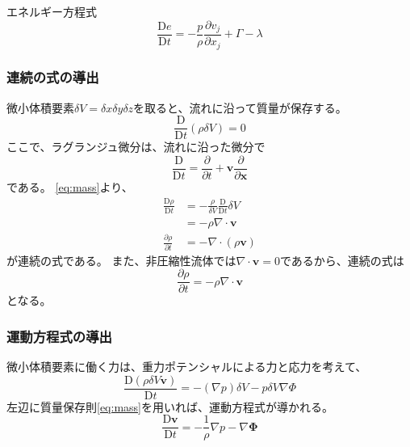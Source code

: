 \documentclass{jsarticle}
\newcommand{\bx}{\mathbf{x}}
\newcommand{\bv}{\mathbf{v}}
\newcommand{\pder}[2][]{\frac{\partial#1}{\partial#2}}
\newcommand{\Dder}[2][]{\frac{\mathrm{D}#1}{\mathrm{D}#2}}
\begin{document}
エネルギー方程式
\begin{equation}
    \Dder[e]{t} = - \frac{p}{\rho} \pder[v_j]{x_j} + \Gamma - \lambda
\end{equation}
\subsubsection{連続の式の導出}
微小体積要素$\delta V = \delta x \delta y \delta z$を取ると、流れに沿って質量が保存する。
\begin{equation}
    \Dder[]{t} (\rho\delta V)= 0\label{eq:mass}
\end{equation}
ここで、ラグランジュ微分は、流れに沿った微分で
\begin{equation}
    \Dder[]{t} = \pder[]{t} + \bv\pder[]{\bx}
\end{equation}
である。
\eqref{eq:mass}より、
\begin{align}
    \Dder[\rho]{t} &= -\frac{\rho}{\delta V}\Dder[]{t} \delta V \\
     &= - \rho \nabla \cdot \bv\\
    \pder[\rho]{t} &= -  \nabla \cdot (\rho\bv)\label{eq:continuous}
\end{align}
\label{eq:continuous}が連続の式である。
また、非圧縮性流体では$\nabla \cdot \bv = 0$であるから、連続の式は
\begin{equation}
    \pder[\rho]{t} = -  \rho \nabla \cdot \bv
\end{equation}
となる。
\subsubsection{運動方程式の導出}
微小体積要素に働く力は、重力ポテンシャルによる力と応力を考えて、
\begin{equation}
     \Dder[(\rho \delta V \bv)]{t} = - (\nabla p) \delta V - p \delta V \nabla \Phi
\end{equation}
左辺に質量保存則\eqref{eq:mass}を用いれば、運動方程式が導かれる。
\begin{equation}
    \Dder[\bv]{t} = - \frac{1}{\rho}\nabla p - \nabla\mathbf{\Phi}
\end{equation}
\end{document}
